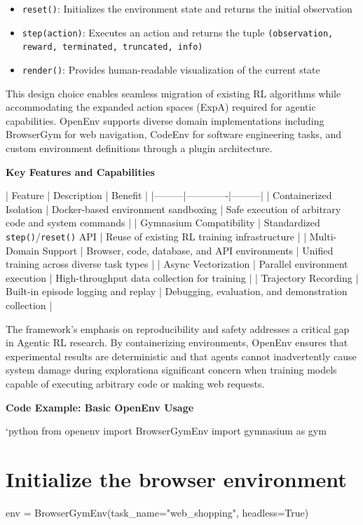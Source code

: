 \begin{itemize}
    \item \texttt{reset()}: Initializes the environment state and returns the initial observation
    \item \texttt{step(action)}: Executes an action and returns the tuple \texttt{(observation, reward, terminated, truncated, info)}
    \item \texttt{render()}: Provides human-readable visualization of the current state

\end{itemize}
This design choice enables seamless migration of existing RL algorithms while accommodating the expanded action spaces (ExpA) required for agentic capabilities. OpenEnv supports diverse domain implementations including BrowserGym for web navigation, CodeEnv for software engineering tasks, and custom environment definitions through a plugin architecture.

\textbf{Key Features and Capabilities}

| Feature | Description | Benefit |
|---------|-------------|---------|
| Containerized Isolation | Docker-based environment sandboxing | Safe execution of arbitrary code and system commands |
| Gymnasium Compatibility | Standardized \texttt{step()}/\texttt{reset()} API | Reuse of existing RL training infrastructure |
| Multi-Domain Support | Browser, code, database, and API environments | Unified training across diverse task types |
| Async Vectorization | Parallel environment execution | High-throughput data collection for training |
| Trajectory Recording | Built-in episode logging and replay | Debugging, evaluation, and demonstration collection |

The framework's emphasis on reproducibility and safety addresses a critical gap in Agentic RL research. By containerizing environments, OpenEnv ensures that experimental results are deterministic and that agents cannot inadvertently cause system damage during explorationa significant concern when training models capable of executing arbitrary code or making web requests.

\textbf{Code Example: Basic OpenEnv Usage}

\texttt{}`python
from openenv import BrowserGymEnv
import gymnasium as gym

\section{Initialize the browser environment}
env = BrowserGymEnv(task_name="web_shopping", headless=True)

